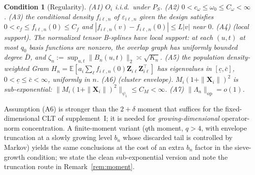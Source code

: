 \documentclass[11pt]{article}
\newtheorem{condition}{Condition}
\theoremstyle{remark}\newtheorem{remark}{Remark}
\newcommand{\E}{\mathbb{E}}
\newcommand{\X}{\bm{X}}
\newcommand{\Z}{\bm{Z}}
\newcommand{\op}{\mathrm{op}}
\begin{document}
\begin{condition}[Regularity]\label{cond:reg}
\emph{(A1)} $O_i$ i.i.d.\ under $P_S$. \emph{(A2)} $0<c_\omega\le\omega_0\le
C_\omega<\infty$. \emph{(A3)} the conditional density $f_{i\ell,n}$ of
$\varepsilon_{i\ell,n}$ given the design satisfies $0<c_f\le f_{i\ell,n}(0)\le
C_f$ and $|f_{i\ell,n}(v)-f_{i\ell,n}(0)|\le L|v|$ near $0$. \emph{(A4) (local
support).} The normalized tensor B-splines have local support: at each $(u,t)$
at most $q_0$ basis functions are nonzero, the overlap graph has uniformly
bounded degree $\bar D$, and $\zeta_n:=\sup_{u,t}\|B_n(u,t)\|_2\asymp\sqrt{K_n}$.
\emph{(A5)} the population density-weighted Gram
$H_n=\E[a_i\sum_\ell f_{i\ell,n}(0)\Z_{i\ell}\Z_{i\ell}^\top]$ has eigenvalues in
$[\underline c,\bar c]$, $0<\underline c\le\bar c<\infty$, uniformly in $n$.
\emph{(A6) (cluster envelope).} $M_i(1+\|\X_i\|)^2$ is sub-exponential:
$\|M_i(1+\|\X_i\|)^2\|_{\psi_1}\le C_M<\infty$. \emph{(A7)}
$\|\Lambda_n\|_\op=o(1)$.
\end{condition}

\noindent Assumption (A6) is stronger than the $2{+}\delta$ moment that suffices
for the fixed-dimensional CLT of supplement~I; it is needed for
\emph{growing-dimensional} operator-norm concentration. A finite-moment variant
($q$th moment, $q>4$, with envelope truncation at a slowly growing level $b_n$
whose discarded tail is controlled by Markov) yields the same conclusions at the
cost of an extra $b_n$ factor in the sieve-growth condition; we state the clean
sub-exponential version and note the truncation route in Remark~\ref{rem:moment}.
\end{document}
